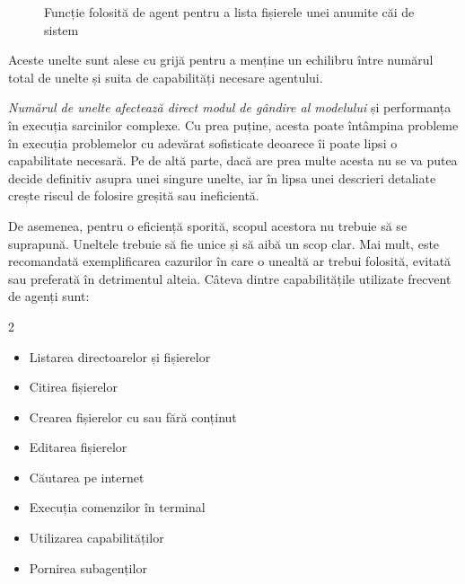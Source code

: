 \documentclass[12pt, a4paper, oneside, romanian]{teza-upb}
\begin{document}
    \begin{figure}[H]
      
      \caption{Funcție folosită de agent pentru a lista fișierele unei anumite căi de sistem}
      \label{fig:tool-py}
    \end{figure} 
 
    Aceste unelte sunt alese cu grijă pentru a menține un echilibru între numărul total de unelte și suita de capabilități necesare agentului.

    \textit{Numărul de unelte afectează direct modul de gândire al modelului} și performanța în execuția sarcinilor complexe. Cu prea puține, acesta poate întâmpina probleme în execuția problemelor cu adevărat sofisticate
    deoarece îi poate lipsi o capabilitate necesară. Pe de altă parte, dacă are prea multe acesta nu se va putea decide definitiv asupra unei singure unelte, iar în lipsa unei descrieri detaliate
    crește riscul de folosire greșită sau ineficientă.

    De asemenea, pentru o eficiență sporită, scopul acestora nu trebuie să se suprapună. Uneltele trebuie să fie unice și să aibă un scop clar. Mai mult, este recomandată exemplificarea cazurilor în care o unealtă ar trebui folosită, evitată sau preferată în detrimentul alteia. 
    Câteva dintre capabilitățile utilizate frecvent de agenți sunt:

    \begin{multicols}{2}
      \begin{itemize}
        \item Listarea directoarelor și fișierelor
        \item Citirea fișierelor
        \item Crearea fișierelor cu sau fără conținut
        \item Editarea fișierelor
        \item Căutarea pe internet
        \item Execuția comenzilor în terminal
        \item Utilizarea capabilităților
        \item Pornirea subagenților
      \end{itemize}
    \end{multicols}
\end{document}
